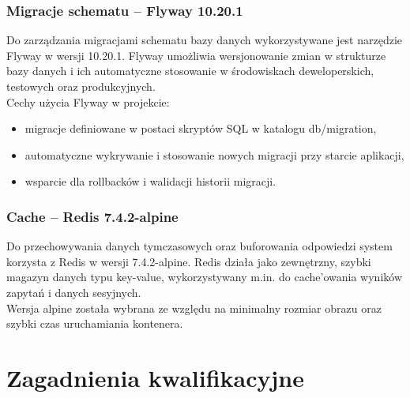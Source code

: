 \documentclass[12pt]{article}
\begin{document}
	\subsubsection{Migracje schematu – Flyway 10.20.1}
	Do zarządzania migracjami schematu bazy danych wykorzystywane jest narzędzie Flyway w wersji 10.20.1. Flyway umożliwia wersjonowanie zmian w strukturze bazy danych i ich automatyczne stosowanie w środowiskach deweloperskich, testowych oraz produkcyjnych. \\
	Cechy użycia Flyway w projekcie:
	\begin{itemize}
		\item migracje definiowane w postaci skryptów SQL w katalogu db/migration,
		
		\item automatyczne wykrywanie i stosowanie nowych migracji przy starcie aplikacji,
		
		\item wsparcie dla rollbacków i walidacji historii migracji.
	\end{itemize}
	
	\subsubsection{Cache – Redis 7.4.2-alpine}
	\label{cache}
	Do przechowywania danych tymczasowych oraz buforowania odpowiedzi system korzysta z Redis w wersji 7.4.2-alpine. Redis działa jako zewnętrzny, szybki magazyn danych typu key-value, wykorzystywany m.in. do cache’owania wyników zapytań i danych sesyjnych. \\
	Wersja alpine została wybrana ze względu na minimalny rozmiar obrazu oraz szybki czas uruchamiania kontenera.
	
	\section{Zagadnienia kwalifikacyjne}
\end{document}
